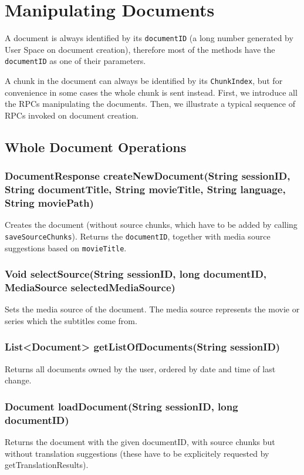 {\section{Manipulating Documents}
\label{sec:rpc:doc}

A document is always identified by its {\tt documentID} (a long number generated by User Space on document creation), therefore most of the methods have the {\tt documentID} as one of their parameters.

A chunk in the document can always be identified by its {\tt ChunkIndex}, but for convenience in some cases the whole chunk is sent instead.
First, we introduce all the RPCs manipulating the documents. Then, we illustrate a typical sequence of RPCs invoked on document creation.

\subsection{Whole Document Operations}

\subsubsection{DocumentResponse createNewDocument(String sessionID, String documentTitle, String movieTitle, String language, String moviePath)}

Creates the document
(without source chunks, which have to be added by calling {\tt saveSourceChunks}).
Returns the {\tt documentID}, together with media source suggestions based on {\tt movieTitle}.
     	
\subsubsection{Void selectSource(String sessionID, long documentID, MediaSource selectedMediaSource)}
Sets the media source of the document. The media source represents the movie or series which the subtitles come from.

\subsubsection{List<Document> getListOfDocuments(String sessionID)}
Returns all documents owned by the user, ordered by date and time of last change.

\subsubsection{Document loadDocument(String sessionID, long documentID)}
Returns the document with the given documentID, with source chunks but without translation suggestions (these have to be explicitely requested by getTranslationResults).

}
